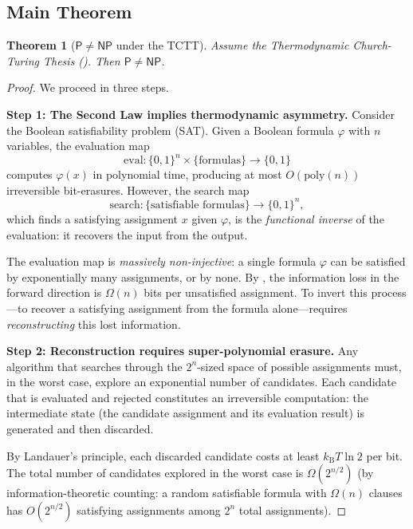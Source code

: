 \documentclass[12pt, a4paper]{article}
\theoremstyle{plain}
\newtheorem{theorem}{Theorem}[section]
\theoremstyle{definition}
\theoremstyle{remark}
\newcommand{\Pc}{\mathsf{P}}
\newcommand{\NPc}{\mathsf{NP}}
\newcommand{\poly}{\mathrm{poly}}
\newcommand{\kB}{k_{\mathrm{B}}}
\begin{document}
\subsection{Main Theorem}

\begin{theorem}[$\Pc \neq \NPc$ under the TCTT]\label{thm:main}
  Assume the Thermodynamic Church-Turing Thesis ().
  Then $\Pc \neq \NPc$.
\end{theorem}

\begin{proof}
  We proceed in three steps.

  \textbf{Step 1: The Second Law implies thermodynamic asymmetry.}
  Consider the Boolean satisfiability problem (SAT). Given a Boolean formula
  $\varphi$ with $n$ variables, the evaluation map
  \begin{equation}
    \text{eval}: \{0,1\}^n \times \{\text{formulas}\} \to \{0,1\}
  \end{equation}
  computes $\varphi(x)$ in polynomial time, producing at most $O(\poly(n))$
  irreversible bit-erasures. However, the search map
  \begin{equation}
    \text{search}: \{\text{satisfiable formulas}\} \to \{0,1\}^n,
  \end{equation}
  which finds a satisfying assignment $x$ given $\varphi$, is the
  \emph{functional inverse} of the evaluation: it recovers the input
  from the output.

  The evaluation map is \emph{massively non-injective}: a single formula
  $\varphi$ can be satisfied by exponentially many assignments, or by none.
  By , the information loss in the forward direction
  is $\Omega(n)$ bits per unsatisfied assignment. To invert this process
  ---to recover a satisfying assignment from the formula alone---requires
  \emph{reconstructing} this lost information.

  \textbf{Step 2: Reconstruction requires super-polynomial erasure.}
  Any algorithm that searches through the $2^n$-sized space of possible
  assignments must, in the worst case, explore an exponential number of
  candidates. Each candidate that is evaluated and rejected constitutes
  an irreversible computation: the intermediate state (the candidate
  assignment and its evaluation result) is generated and then discarded.

  By Landauer's principle, each discarded candidate costs at least
  $\kB T \ln 2$ per bit. The total number of candidates explored in
  the worst case is $\Omega(2^{n/2})$ (by information-theoretic counting:
  a random satisfiable formula with $\Omega(n)$ clauses has
  $O(2^{n/2})$ satisfying assignments among $2^n$ total assignments).


\end{proof}
\end{document}
